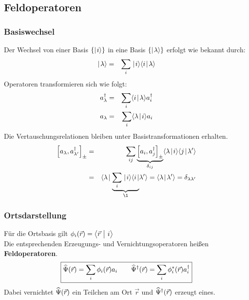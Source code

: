 \subsection{Feldoperatoren}
\subsubsection{Basiswechsel}
Der Wechsel von einer Basis $\{\mid\!\!\!\,\,{i}\rangle\}$ in eine Basis $\{\mid\!\!\!\,\,{\lambda}\rangle\}$ erfolgt wie bekannt durch:
\begin{eqnarray*}
\ket{\lambda} &=& \sum_i \ket{i}\braket{i}{\lambda}
\end{eqnarray*}
Operatoren transformieren sich wie folgt: 
\begin{eqnarray*}
a_\lambda^\dagger &=& \sum_i \braket{i}{\lambda} a_i^\dagger
\\
a_\lambda &=& \sum_i \braket{\lambda}{i} a_i
\end{eqnarray*}
Die Vertauschungsrelationen bleiben unter Basistransformationen erhalten.
\begin{eqnarray*}
\left[ a_\lambda , a_{\lambda'}^\dagger \ri ] _\pm \g \sum \limits_{i j} \underbrace{ \left[ a_i, a_j^\dagger \ri ]_\pm}_{\delta_{i j}} \braket{\lambda}{i}\braket{j}{\lambda'}
\\
&=& \bra{\lambda} \underbrace{\sum_i  \ket{i}\bra{i}}_{\1}\!\!\!\,\,{\lambda'}\rangle = \braket{\lambda}{\lambda'} = \delta_{\lambda \lambda '}
\end{eqnarray*}


\subsubsection{Ortsdarstellung}
Für die Ortsbasis gilt $\phi_i(\vec r) = \left < \vec r \ \big| \  i \right >$\\
Die entsprechenden Erzeugungs- und Vernichtungsoperatoren heißen {\bf Feldoperatoren}.
\begin{eqnarray*}
\boxed{\widehat\Psi(\vec r) = \sum \limits_ i \phi _i(\vec r) a_i \qquad
\widehat\Psi^\dagger(\vec r) = \sum \limits_ i \phi^* _i(\vec r) a_i^\dagger}
\end{eqnarray*}
Dabei vernichtet $\widehat\Psi(\vec r)$ ein Teilchen am Ort $\vec{r}$ und $\widehat\Psi^\dagger(\vec r)$ erzeugt eines.

